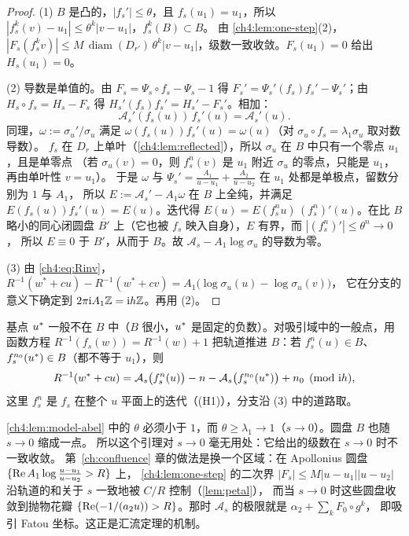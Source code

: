 \begin{proof}
(1) $B$ 是凸的，$|f_s'|\le\theta$，且 $f_s(u_1)=u_1$，所以 $|f_s^k(v)-u_1|\le\theta^k|v-u_1|$，$f_s^k(B)\subset B$。
由 \cref{ch4:lem:one-step}(2)，$|F_s(f_s^kv)|\le M\,\operatorname{diam}(D_{r'})\,\theta^k|v-u_1|$，级数一致收敛。$F_s(u_1)=0$ 给出 $H_s(u_1)=0$。

(2) 导数是单值的。由 $F_s=\Psi_s\circ f_s-\Psi_s-1$ 得 $F_s'=\Psi_s'(f_s)f_s'-\Psi_s'$；由 $H_s\circ f_s=H_s-F_s$ 得
$H_s'(f_s)f_s'=H_s'-F_s'$。相加：
\[
 \mathcal A_s'(f_s(u))\,f_s'(u)=\mathcal A_s'(u).
\]
同理，$\omega:=\sigma_u'/\sigma_u$ 满足 $\omega(f_s(u))f_s'(u)=\omega(u)$（对 $\sigma_u\circ f_s=\lambda_1\sigma_u$ 取对数导数）。
$f_s$ 在 $D_r$ 上单叶（\cref{ch4:lem:reflected}），所以 $\sigma_u$ 在 $B$ 中只有一个零点 $u_1$，且是单零点
（若 $\sigma_u(v)=0$，则 $f_s^n(v)$ 是 $u_1$ 附近 $\sigma_u$ 的零点，只能是 $u_1$，再由单叶性 $v=u_1$）。
于是 $\omega$ 与 $\Psi_s'=\frac{A_1}{u-u_1}+\frac{A_2}{u-u_2}$ 在 $u_1$ 处都是单极点，留数分别为 $1$ 与 $A_1$，
所以 $E:=\mathcal A_s'-A_1\omega$ 在 $B$ 上全纯，并满足 $E(f_s(u))f_s'(u)=E(u)$。迭代得
$E(u)=E(f_s^nu)\,(f_s^n)'(u)$。在比 $B$ 略小的同心闭圆盘 $\overline{B'}$ 上（它也被 $f_s$ 映入自身），$E$ 有界，而 $|(f_s^n)'|\le\theta^n\to0$，
所以 $E\equiv0$ 于 $B'$，从而于 $B$。故 $\mathcal A_s-A_1\log\sigma_u$ 的导数为零。

(3) 由 \eqref{ch4:eq:Rinv}，$R^{-1}(w^*+cu)-R^{-1}(w^*+cv)=A_1\bigl(\log\sigma_u(u)-\log\sigma_u(v)\bigr)$，
它在分支的意义下确定到 $2\pi\mathrm{i} A_1\mathbb{Z}=\mathrm{i} h\mathbb{Z}$。再用 (2)。
\end{proof}

基点 $u^{*}$ 一般不在 $B$ 中（$B$ 很小，$u^{*}$ 是固定的负数）。对吸引域中的一般点，用函数方程 $R^{-1}(f_s(w))=R^{-1}(w)+1$
把轨道推进 $B$：若 $f_s^n(u)\in B$、$f_s^{n_0}(u^{*})\in B$（都不等于 $u_1$），则
\[
 R^{-1}(w^*+cu)=\mathcal A_s\bigl(f_s^n(u)\bigr)-n-\mathcal A_s\bigl(f_s^{n_0}(u^{*})\bigr)+n_0\pmod{\mathrm{i} h},
\]
这里 $f_s^n$ 是 $f_s$ 在整个 $u$ 平面上的迭代（(H1)），分支沿 (3) 中的道路取。

\begin{remark}[困难在于一致性]\label{ch4:rem:uniformity}
\cref{ch4:lem:model-abel} 中的 $\theta$ 必须小于 $1$，而 $\theta\ge\lambda_1\to1$（$s\to0$）。圆盘 $B$ 也随 $s\to0$ 缩成一点。
所以这个引理对 $s\to0$ 毫无用处：它给出的级数在 $s\to0$ 时不一致收敛。
第~\ref{ch:confluence} 章的做法是换一个区域：在 Apollonius 圆盘 $\{\operatorname{Re} A_1\log\frac{u-u_1}{u-u_2}>R\}$ 上，
\cref{ch4:lem:one-step} 的二次界 $|F_s|\le M|u-u_1||u-u_2|$ 沿轨道的和关于 $s$ 一致地被 $C/R$ 控制（\cref{lem:petal}），
而当 $s\to0$ 时这些圆盘收敛到抛物花瓣 $\{\operatorname{Re}(-1/(a_2u))>R\}$。那时 $\mathcal A_s$ 的极限就是 $\alpha_2+\sum_kF_0\circ g^k$，
即吸引 Fatou 坐标。这正是汇流定理的机制。
\end{remark}


